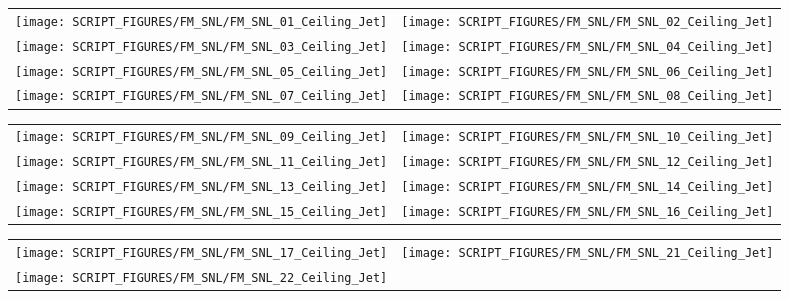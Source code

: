 \begin{figure}[p]
\begin{tabular*}{\textwidth}{l@{\extracolsep{\fill}}r}
\texttt{[image: SCRIPT\_FIGURES/FM\_SNL/FM\_SNL\_01\_Ceiling\_Jet]} &
\texttt{[image: SCRIPT\_FIGURES/FM\_SNL/FM\_SNL\_02\_Ceiling\_Jet]} \\
\texttt{[image: SCRIPT\_FIGURES/FM\_SNL/FM\_SNL\_03\_Ceiling\_Jet]} &
\texttt{[image: SCRIPT\_FIGURES/FM\_SNL/FM\_SNL\_04\_Ceiling\_Jet]} \\
\texttt{[image: SCRIPT\_FIGURES/FM\_SNL/FM\_SNL\_05\_Ceiling\_Jet]} &
\texttt{[image: SCRIPT\_FIGURES/FM\_SNL/FM\_SNL\_06\_Ceiling\_Jet]} \\
\texttt{[image: SCRIPT\_FIGURES/FM\_SNL/FM\_SNL\_07\_Ceiling\_Jet]} &
\texttt{[image: SCRIPT\_FIGURES/FM\_SNL/FM\_SNL\_08\_Ceiling\_Jet]}
\end{tabular*}
\end{figure}

\begin{figure}[p]
\begin{tabular*}{\textwidth}{l@{\extracolsep{\fill}}r}
\texttt{[image: SCRIPT\_FIGURES/FM\_SNL/FM\_SNL\_09\_Ceiling\_Jet]} &
\texttt{[image: SCRIPT\_FIGURES/FM\_SNL/FM\_SNL\_10\_Ceiling\_Jet]} \\
\texttt{[image: SCRIPT\_FIGURES/FM\_SNL/FM\_SNL\_11\_Ceiling\_Jet]} &
\texttt{[image: SCRIPT\_FIGURES/FM\_SNL/FM\_SNL\_12\_Ceiling\_Jet]} \\
\texttt{[image: SCRIPT\_FIGURES/FM\_SNL/FM\_SNL\_13\_Ceiling\_Jet]} &
\texttt{[image: SCRIPT\_FIGURES/FM\_SNL/FM\_SNL\_14\_Ceiling\_Jet]} \\
\texttt{[image: SCRIPT\_FIGURES/FM\_SNL/FM\_SNL\_15\_Ceiling\_Jet]} &
\texttt{[image: SCRIPT\_FIGURES/FM\_SNL/FM\_SNL\_16\_Ceiling\_Jet]}
\end{tabular*}
\end{figure}

\begin{figure}[p]
\begin{tabular*}{\textwidth}{l@{\extracolsep{\fill}}r}
\texttt{[image: SCRIPT\_FIGURES/FM\_SNL/FM\_SNL\_17\_Ceiling\_Jet]} &
\texttt{[image: SCRIPT\_FIGURES/FM\_SNL/FM\_SNL\_21\_Ceiling\_Jet]} \\
\texttt{[image: SCRIPT\_FIGURES/FM\_SNL/FM\_SNL\_22\_Ceiling\_Jet]}
\end{tabular*}
\end{figure}

